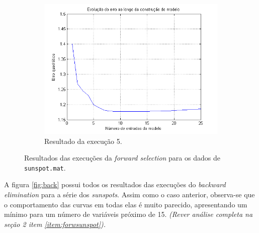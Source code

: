 \begin{figure}[H]
			\begin{subfigure}{.5\textwidth}
				  \centering
				  \includegraphics[width=1\linewidth]{image/forward5}
				  \caption{Resultado da execução 5.}
				  \label{forward5}
				\end{subfigure}	
			
			\caption{Resultados das execuções da \textit{forward selection} para os
			dados de \texttt{sunspot.mat}.}
			\label{fig:forw}
			\end{figure}
			
		\FloatBarrier


A figura \ref{fig:back} possui todos os resultados das
execuções do \textit{backward elimination} para a série dos \textit{sunspots}.
Assim como o caso anterior, observa-se que o comportamento das curvas em todas elas é muito
parecido, apresentando um mínimo para um número de variáveis próximo de 15.
\textit{(Rever análise completa na seção 2 item \ref{item:forwsunspot}).}
		

